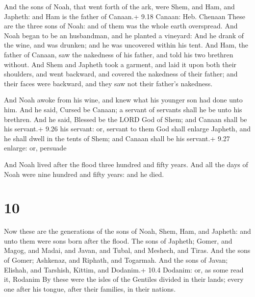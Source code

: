  And the sons of Noah, that went forth of the ark, were
Shem, and Ham, and Japheth: and Ham is the father of Canaan.+ 9.18
Canaan: Heb. Chenaan  These are the three sons of Noah: and
of them was the whole earth overspread.  And Noah began to
be an husbandman, and he planted a vineyard:  And he drank
of the wine, and was drunken; and he was uncovered within his tent.
 And Ham, the father of Canaan, saw the nakedness of his
father, and told his two brethren without.  And Shem and
Japheth took a garment, and laid it upon both their shoulders, and went
backward, and covered the nakedness of their father; and their faces
were backward, and they saw not their father's nakedness.

 And Noah awoke from his wine, and knew what his younger
son had done unto him.  And he said, Cursed be Canaan; a
servant of servants shall he be unto his brethren.  And he
said, Blessed be the LORD God of Shem; and Canaan shall be his servant.+
9.26 his servant: or, servant to them  God shall enlarge
Japheth, and he shall dwell in the tents of Shem; and Canaan shall be
his servant.+ 9.27 enlarge: or, persuade

 And Noah lived after the flood three hundred and fifty
years.  And all the days of Noah were nine hundred and
fifty years: and he died.

\hypertarget{section-9}{%
\section{10}\label{section-9}}

 Now these are the generations of the sons of Noah, Shem,
Ham, and Japheth: and unto them were sons born after the flood.
 The sons of Japheth; Gomer, and Magog, and Madai, and
Javan, and Tubal, and Meshech, and Tiras.  And the sons of
Gomer; Ashkenaz, and Riphath, and Togarmah.  And the sons of
Javan; Elishah, and Tarshish, Kittim, and Dodanim.+ 10.4 Dodanim: or, as
some read it, Rodanim  By these were the isles of the
Gentiles divided in their lands; every one after his tongue, after their
families, in their nations.

